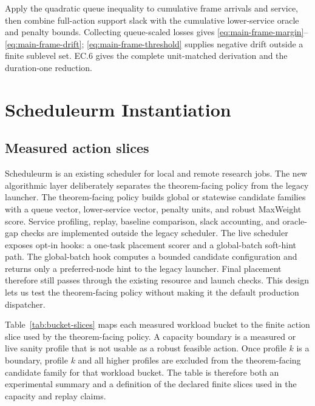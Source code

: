 \documentclass[opre,dblanonrev]{informs4}
\begin{document}
Apply the quadratic queue inequality to cumulative frame arrivals and service,
then combine full-action support slack with the cumulative lower-service oracle
and penalty bounds.  Collecting queue-scaled losses gives
\eqref{eq:main-frame-margin}--\eqref{eq:main-frame-drift};
\eqref{eq:main-frame-threshold} supplies negative drift outside a finite
sublevel set.  EC.6 gives the complete unit-matched derivation and the
duration-one reduction.
\endproof

\section{Scheduleurm Instantiation}
\label{sec:implementation}

\subsection{Measured action slices}
\label{subsec:measured-slices}

Scheduleurm is an existing scheduler for local and remote research jobs.  The
new algorithmic layer deliberately separates the theorem-facing policy from the
legacy launcher.  The theorem-facing policy builds global or statewise candidate
families with a queue vector, lower-service vector, penalty units, and robust
MaxWeight score.  Service profiling, replay, baseline comparison, slack
accounting, and oracle-gap checks are implemented outside the legacy scheduler.
The live scheduler exposes opt-in hooks: a one-task placement scorer and a
global-batch soft-hint path.  The global-batch hook computes a bounded candidate
configuration and returns only a preferred-node hint to the legacy launcher.
Final placement therefore still passes through the existing resource and launch
checks.  This design lets us test the theorem-facing policy without making it
the default production dispatcher.

Table~\ref{tab:bucket-slices} maps each measured workload bucket to the
finite action slice used by the theorem-facing policy.  A capacity boundary is
a measured or live sanity profile that is not usable as a robust feasible
action.  Once profile \(k\) is a boundary, profile \(k\) and all higher profiles
are excluded from the theorem-facing candidate family for that workload bucket.
The table is therefore both an experimental summary and a definition of the
declared finite slices used in the capacity and replay claims.
\end{document}
